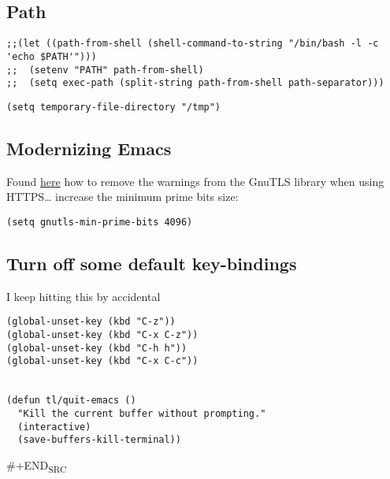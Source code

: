 \documentclass[12pt]{article}
\begin{document}
\subsection{Path}
\label{sec:org7551d26}

\begin{verbatim}
;;(let ((path-from-shell (shell-command-to-string "/bin/bash -l -c 'echo $PATH'")))
;;  (setenv "PATH" path-from-shell)
;;  (setq exec-path (split-string path-from-shell path-separator)))

\end{verbatim}

\begin{verbatim}
(setq temporary-file-directory "/tmp")
\end{verbatim}

\subsection{Modernizing Emacs}
\label{sec:org4954bbd}

Found \href{https://github.com/wasamasa/dotemacs/blob/master/init.org\#init}{here} how to remove the warnings from the GnuTLS library when
using HTTPS\ldots{} increase the minimum prime bits size:
\begin{verbatim}
(setq gnutls-min-prime-bits 4096)
\end{verbatim}

\subsection{Turn off some default key-bindings}
\label{sec:orgc7e6d7a}
I keep hitting this by accidental
\begin{verbatim}
(global-unset-key (kbd "C-z"))
(global-unset-key (kbd "C-x C-z"))
(global-unset-key (kbd "C-h h"))
(global-unset-key (kbd "C-x C-c"))


(defun tl/quit-emacs ()
  "Kill the current buffer without prompting."
  (interactive)
  (save-buffers-kill-terminal))

\end{verbatim}
\#+END\textsubscript{SRC}
\end{document}
